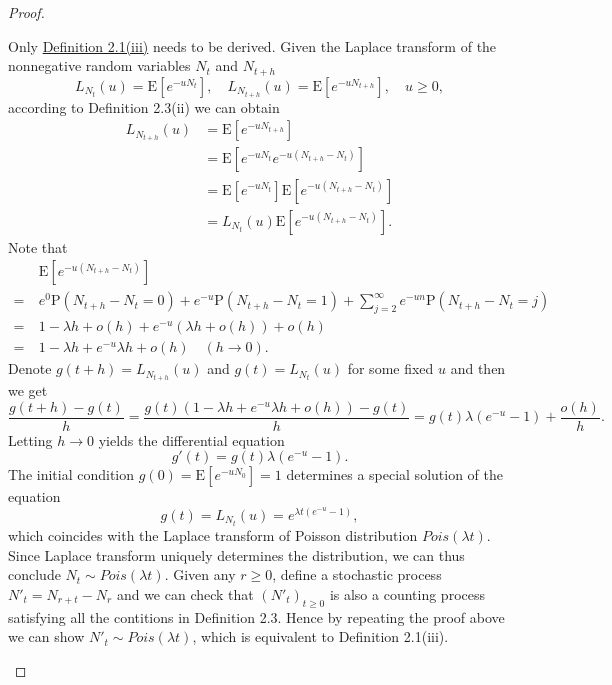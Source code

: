 \documentclass{report}
\theoremstyle{nonumberplain}
\newtheorem{proof}{Proof.}
\begin{document}
\begin{proof}
\begin{itemize}
	Only \hyperlink{Definition 2.1(iii)}{Definition 2.1(iii)} needs to be derived. Given the Laplace transform of the nonnegative random variables $N_t$ and $N_{t+h}$
	\[
	L_{N_t}(u)=\mathrm{E}[e^{-uN_t}],\quad
	L_{N_{t+h}}(u)=\mathrm{E}[e^{-uN_{t+h}}],\quad u\ge0,
	\]
	according to Definition 2.3(ii) we can obtain
	\begin{align*}
	L_{N_{t+h}}(u)&=\mathrm{E}[e^{-uN_{t+h}}]\\
	&=\mathrm{E}[e^{-uN_{t}}e^{-u(N_{t+h}-N_t)}]\\
	&=\mathrm{E}[e^{-uN_{t}}]\mathrm{E}[e^{-u(N_{t+h}-N_t)}]\\
	&=L_{N_t}(u)\mathrm{E}[e^{-u(N_{t+h}-N_t)}].
	\end{align*}
	Note that 
	\begin{align*}
	&\mathrm{E}[e^{-u(N_{t+h}-N_t)}]\\
	=\ &e^{0}\mathrm{P}(N_{t+h}-N_t=0)+e^{-u}\mathrm{P}(N_{t+h}-N_t=1)+\sum_{j=2}^{\infty}e^{-un}\mathrm{P}(N_{t+h}-N_t=j)\\
	=\ &1-\lambda h+o(h)+e^{-u}(\lambda h+o(h))+o(h)\\
	=\ &1-\lambda h+e^{-u}\lambda h+o(h)\quad(h\to 0).
	\end{align*}
	Denote $g(t+h)=L_{N_{t+h}}(u)$ and $g(t)=L_{N_{t}}(u)$ for some fixed $u$ and then we get 
	\[
	\frac{g(t+h)-g(t)}{h}=\frac{g(t)(1-\lambda h+e^{-u}\lambda h+o(h))-g(t)}{h}=g(t)\lambda (e^{-u}-1)+\frac{o(h)}{h}.
	\]
	Letting $h\to 0$ yields the differential equation
	\[
	g'(t)=g(t)\lambda (e^{-u}-1).
	\]
	The initial condition $g(0)=\mathrm{E}[e^{-uN_{0}}]=1$ determines a special solution of the equation 
	$$g(t)=L_{N_{t}}(u)=e^{\lambda t (e^{-u}-1)},$$
	which coincides with the Laplace transform of Poisson distribution $Pois(\lambda t)$. Since Laplace transform uniquely determines the distribution, we can thus conclude $N_{t}\sim Pois(\lambda t)$. Given any $r\ge 0$, define a stochastic process $N'_t=N_{r+t}-N_r$ and we can check that $(N'_t)_{t\ge 0}$ is also a counting process satisfying all the contitions in Definition 2.3. Hence by repeating the proof above we can show $N'_{t}\sim Pois(\lambda t)$, which is equivalent to Definition 2.1(iii).


\end{itemize}
\end{proof}
\end{document}
